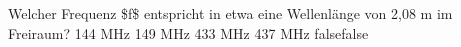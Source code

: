     {Welcher Frequenz \$f\$ entspricht in etwa eine Wellenlänge von 2,08 m im Freiraum?}
    {144 MHz}
    {149 MHz}
    {433 MHz}
    {437 MHz}
    {false}{false}